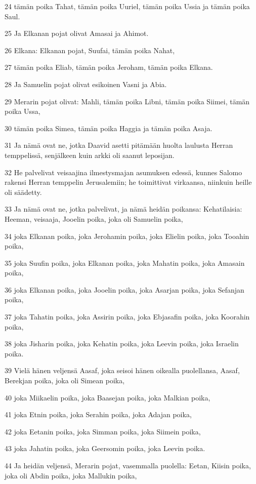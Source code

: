 \par 24 tämän poika Tahat, tämän poika Uuriel, tämän poika Ussia ja tämän poika Saul.
\par 25 Ja Elkanan pojat olivat Amasai ja Ahimot.
\par 26 Elkana: Elkanan pojat, Suufai, tämän poika Nahat,
\par 27 tämän poika Eliab, tämän poika Jeroham, tämän poika Elkana.
\par 28 Ja Samuelin pojat olivat esikoinen Vasni ja Abia.
\par 29 Merarin pojat olivat: Mahli, tämän poika Libni, tämän poika Siimei, tämän poika Ussa,
\par 30 tämän poika Simea, tämän poika Haggia ja tämän poika Asaja.
\par 31 Ja nämä ovat ne, jotka Daavid asetti pitämään huolta laulusta Herran temppelissä, senjälkeen kuin arkki oli saanut leposijan.
\par 32 He palvelivat veisaajina ilmestysmajan asumuksen edessä, kunnes Salomo rakensi Herran temppelin Jerusalemiin; he toimittivat virkaansa, niinkuin heille oli säädetty.
\par 33 Ja nämä ovat ne, jotka palvelivat, ja nämä heidän poikansa: Kehatilaisia: Heeman, veisaaja, Jooelin poika, joka oli Samuelin poika,
\par 34 joka Elkanan poika, joka Jerohamin poika, joka Elielin poika, joka Tooahin poika,
\par 35 joka Suufin poika, joka Elkanan poika, joka Mahatin poika, joka Amasain poika,
\par 36 joka Elkanan poika, joka Jooelin poika, joka Asarjan poika, joka Sefanjan poika,
\par 37 joka Tahatin poika, joka Assirin poika, joka Ebjasafin poika, joka Koorahin poika,
\par 38 joka Jisharin poika, joka Kehatin poika, joka Leevin poika, joka Israelin poika.
\par 39 Vielä hänen veljensä Aasaf, joka seisoi hänen oikealla puolellansa, Aasaf, Berekjan poika, joka oli Simean poika,
\par 40 joka Miikaelin poika, joka Baasejan poika, joka Malkian poika,
\par 41 joka Etnin poika, joka Serahin poika, joka Adajan poika,
\par 42 joka Eetanin poika, joka Simman poika, joka Siimein poika,
\par 43 joka Jahatin poika, joka Geersomin poika, joka Leevin poika.
\par 44 Ja heidän veljensä, Merarin pojat, vasemmalla puolella: Eetan, Kiisin poika, joka oli Abdin poika, joka Mallukin poika,
